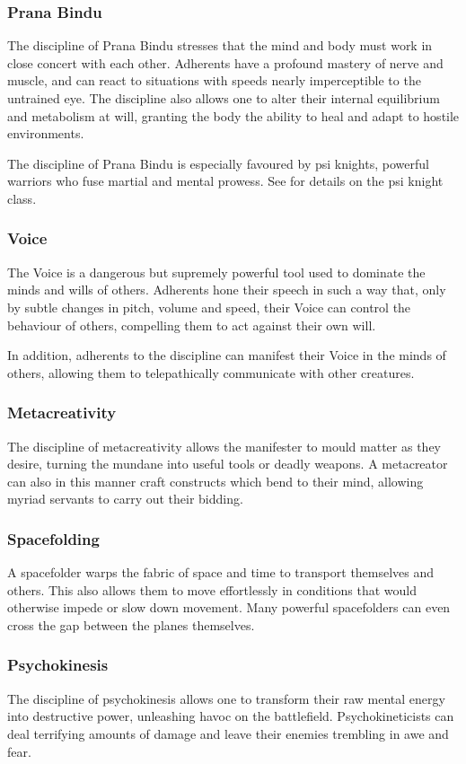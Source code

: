 \subsubsection{Prana Bindu}
The discipline of Prana Bindu stresses that the mind and body
must work in close concert with each other.
Adherents have a profound mastery of nerve and muscle,
and can react to situations with speeds nearly imperceptible
to the untrained eye.
The discipline also allows one to alter their internal equilibrium
and metabolism at will,
granting the body the ability to heal and adapt to hostile environments.

The discipline of Prana Bindu is especially favoured by psi knights,
powerful warriors who fuse martial and mental prowess.
See  for details on the psi knight class.

\subsubsection{Voice}
The Voice is a dangerous but supremely powerful tool
used to dominate the minds and wills of others.
Adherents hone their speech in such a way that,
only by subtle changes in pitch, volume and speed,
their Voice can control the behaviour of others,
compelling them to act against their own will.

In addition, adherents to the discipline can manifest their Voice
in the minds of others, allowing them to telepathically
communicate with other creatures.

\subsubsection{Metacreativity}
The discipline of metacreativity allows the manifester to mould
matter as they desire,
turning the mundane into useful tools or deadly weapons.
A metacreator can also in this manner craft constructs
which bend to their mind,
allowing myriad servants to carry out their bidding.

\subsubsection{Spacefolding}
A spacefolder warps the fabric of space and time to
transport themselves and others.
This also allows them to move effortlessly in conditions
that would otherwise impede or slow down movement. 
Many powerful spacefolders can even cross the gap between
the planes themselves.

\subsubsection{Psychokinesis}
The discipline of psychokinesis allows one to transform
their raw mental energy into destructive power,
unleashing havoc on the battlefield.
Psychokineticists can deal terrifying amounts of damage
and leave their enemies trembling in awe and fear.

